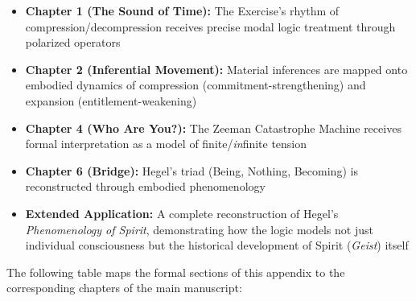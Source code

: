 \documentclass[12pt]{book}
\begin{document}
\begin{itemize}
\item \textbf{Chapter 1 (The Sound of Time):} The Exercise's rhythm of compression/decompression receives precise modal logic treatment through polarized operators
\item \textbf{Chapter 2 (Inferential Movement):} Material inferences are mapped onto embodied dynamics of compression (commitment-strengthening) and expansion (entitlement-weakening)
\item \textbf{Chapter 4 (Who Are You?):} The Zeeman Catastrophe Machine receives formal interpretation as a model of finite/\textit{in}finite tension
\item \textbf{Chapter 6 (Bridge):} Hegel's triad (Being, Nothing, Becoming) is reconstructed through embodied phenomenology
\item \textbf{Extended Application:} A complete reconstruction of Hegel's \emph{Phenomenology of Spirit}, demonstrating how the logic models not just individual consciousness but the historical development of Spirit (\emph{Geist}) itself
\end{itemize}

The following table maps the formal sections of this appendix to the corresponding chapters of the main manuscript:
\end{document}
